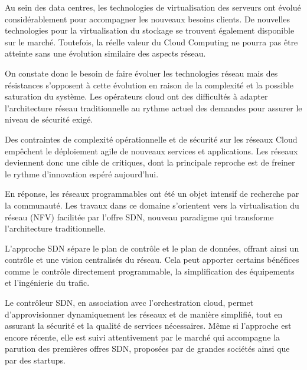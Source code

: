 

Au sein des data centres, les technologies de virtualisation des serveurs ont évolué considérablement pour accompagner les nouveaux besoins clients. De nouvelles technologies pour la virtualisation du stockage se trouvent également disponible sur le marché. Toutefois, la réelle valeur du Cloud Computing ne pourra pas être atteinte sans une évolution similaire des aspects réseau.

On constate donc le besoin de faire évoluer les technologies réseau mais des résistances s'opposent à cette évolution en raison de la complexité et la possible saturation du système. Les opérateurs cloud ont des difficultés à adapter l'architecture réseau traditionnelle au rythme actuel des demandes pour assurer le niveau de sécurité exigé.

Des contraintes de complexité opérationnelle et de sécurité sur les réseaux Cloud empêchent le déploiement agile de nouveaux services et applications. Les réseaux deviennent donc une cible de critiques, dont la principale reproche est de freiner le rythme d'innovation espéré aujourd'hui.

En réponse, les réseaux programmables ont été un objet intensif de recherche par la communauté. Les travaux dans ce domaine s'orientent vers la virtualisation du réseau (NFV) facilitée par l'offre SDN, nouveau paradigme qui transforme l'architecture traditionnelle. 

L'approche SDN sépare le plan de contrôle et le plan de données, offrant ainsi un contrôle et une vision centralisés du réseau. Cela peut apporter certains bénéfices comme le contrôle directement programmable, la simplification des équipements et l'ingénierie du trafic. %


Le contrôleur SDN, en association avec l'orchestration cloud, permet d'approvisionner dynamiquement les réseaux et de manière simplifié, tout en assurant la sécurité et la qualité de services nécessaires. Même si l'approche est encore récente, elle est suivi attentivement par le marché qui accompagne la parution des premières offres SDN, proposées par de grandes sociétés ainsi que par des startups.



